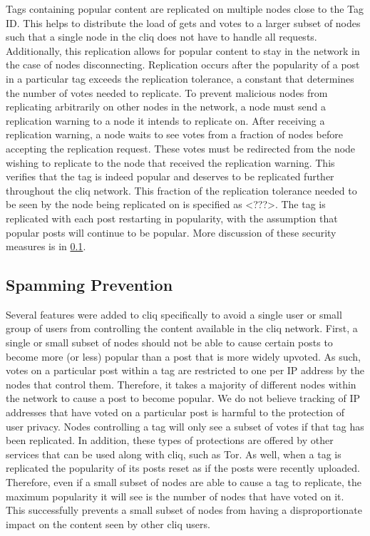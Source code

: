 \documentclass[11pt,twocolumn]{article}
\begin{document}
Tags containing popular content are replicated on multiple nodes close to the Tag ID. 
This helps to distribute the load of gets and votes to a larger subset of nodes such that a single node in the cliq does not have to handle all requests. 
Additionally, this replication allows for popular content to stay in the network in the case of nodes disconnecting. 
Replication occurs after the popularity of a post in a particular tag exceeds the replication tolerance, a constant that determines the number of votes needed to replicate. 
To prevent malicious nodes from replicating arbitrarily on other nodes in the network, a node must send a replication warning to a node it intends to replicate on. 
After receiving a replication warning, a node waits to see votes from a fraction of nodes before accepting the replication request. 
These votes must be redirected from the node wishing to replicate to the node that received the replication warning. 
This verifies that the tag is indeed popular and deserves to be replicated further throughout the cliq network. 
This fraction of the replication tolerance needed to be seen by the node being replicated on is specified as <???>. 
The tag is replicated with each post restarting in popularity, with the assumption that popular posts will continue to be popular. 
More discussion of these security measures is in \ref{subsec:spam}. 

\subsection{Spamming Prevention}
\label{subsec:spam}

Several features were added to cliq specifically to avoid a single user or small group of users from controlling the content available in the cliq network.
First, a single or small subset of nodes should not be able to cause certain posts to become more (or less) popular than a post that is more widely upvoted.
As such, votes on a particular post within a tag are restricted to one per IP address by the nodes that control them. 
Therefore, it takes a majority of different nodes within the network to cause a post to become popular. 
We do not believe tracking of IP addresses that have voted on a particular post is harmful to the protection of user privacy. 
Nodes controlling a tag will only see a subset of votes if that tag has been replicated. 
In addition, these types of protections are offered by other services that can be used along with cliq, such as Tor. 
As well, when a tag is replicated the popularity of its posts reset as if the posts were recently uploaded. 
Therefore, even if a small subset of nodes are able to cause a tag to replicate, the maximum popularity it will see is the number of nodes that have voted on it. 
This successfully prevents a small subset of nodes from having a disproportionate impact on the content seen by other cliq users. 
\end{document}
